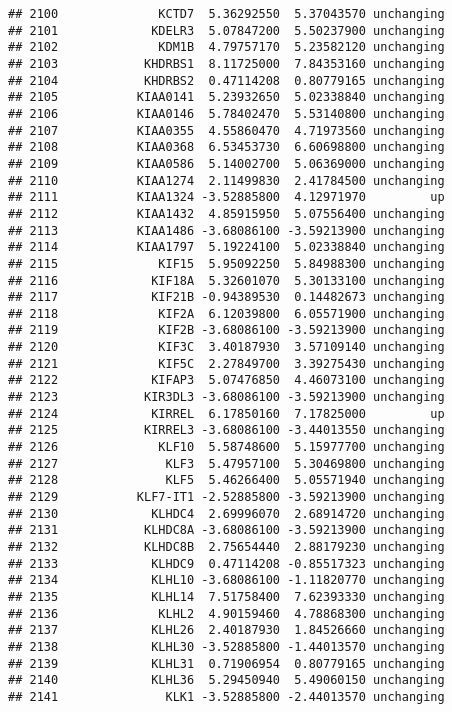 \documentclass[]{article}
\begin{document}
\begin{verbatim}
## 2100              KCTD7  5.36292550  5.37043570 unchanging
## 2101             KDELR3  5.07847200  5.50237900 unchanging
## 2102              KDM1B  4.79757170  5.23582120 unchanging
## 2103            KHDRBS1  8.11725000  7.84353160 unchanging
## 2104            KHDRBS2  0.47114208  0.80779165 unchanging
## 2105           KIAA0141  5.23932650  5.02338840 unchanging
## 2106           KIAA0146  5.78402470  5.53140800 unchanging
## 2107           KIAA0355  4.55860470  4.71973560 unchanging
## 2108           KIAA0368  6.53453730  6.60698800 unchanging
## 2109           KIAA0586  5.14002700  5.06369000 unchanging
## 2110           KIAA1274  2.11499830  2.41784500 unchanging
## 2111           KIAA1324 -3.52885800  4.12971970         up
## 2112           KIAA1432  4.85915950  5.07556400 unchanging
## 2113           KIAA1486 -3.68086100 -3.59213900 unchanging
## 2114           KIAA1797  5.19224100  5.02338840 unchanging
## 2115              KIF15  5.95092250  5.84988300 unchanging
## 2116             KIF18A  5.32601070  5.30133100 unchanging
## 2117             KIF21B -0.94389530  0.14482673 unchanging
## 2118              KIF2A  6.12039800  6.05571900 unchanging
## 2119              KIF2B -3.68086100 -3.59213900 unchanging
## 2120              KIF3C  3.40187930  3.57109140 unchanging
## 2121              KIF5C  2.27849700  3.39275430 unchanging
## 2122             KIFAP3  5.07476850  4.46073100 unchanging
## 2123            KIR3DL3 -3.68086100 -3.59213900 unchanging
## 2124             KIRREL  6.17850160  7.17825000         up
## 2125            KIRREL3 -3.68086100 -3.44013550 unchanging
## 2126              KLF10  5.58748600  5.15977700 unchanging
## 2127               KLF3  5.47957100  5.30469800 unchanging
## 2128               KLF5  5.46266400  5.05571940 unchanging
## 2129           KLF7-IT1 -2.52885800 -3.59213900 unchanging
## 2130             KLHDC4  2.69996070  2.68914720 unchanging
## 2131            KLHDC8A -3.68086100 -3.59213900 unchanging
## 2132            KLHDC8B  2.75654440  2.88179230 unchanging
## 2133             KLHDC9  0.47114208 -0.85517323 unchanging
## 2134             KLHL10 -3.68086100 -1.11820770 unchanging
## 2135             KLHL14  7.51758400  7.62393330 unchanging
## 2136              KLHL2  4.90159460  4.78868300 unchanging
## 2137             KLHL26  2.40187930  1.84526660 unchanging
## 2138             KLHL30 -3.52885800 -1.44013570 unchanging
## 2139             KLHL31  0.71906954  0.80779165 unchanging
## 2140             KLHL36  5.29450940  5.49060150 unchanging
## 2141               KLK1 -3.52885800 -2.44013570 unchanging

\end{verbatim}
\end{document}
